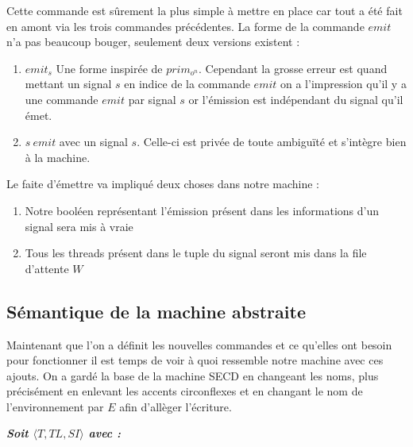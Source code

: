\documentclass[10pt,a4paper]{report}
\begin{document}
Cette commande est sûrement la plus simple à mettre en place car tout a été fait en amont via les trois commandes précédentes. La forme de la commande $emit$ n'a pas beaucoup bouger, seulement deux versions existent :
\begin{enumerate}
\item $emit_{s}$ Une forme inspirée de $prim_{o^{n}}$. Cependant la grosse erreur est quand mettant un signal $s$ en indice de la commande $emit$ on a l'impression qu'il y a une commande $emit$ par signal $s$ or l'émission est indépendant du signal qu'il émet.
\item $s~emit$ avec un signal $s$. Celle-ci est privée de toute ambiguïté et s'intègre bien à la machine. 
\end{enumerate}
\medbreak

Le faite d'émettre va impliqué deux choses dans notre machine :
\begin{enumerate}					
\item Notre booléen représentant l'émission présent dans les informations d'un signal sera mis à vraie
\item Tous les threads présent dans le tuple du signal seront mis dans la file d'attente $W$ 
\end{enumerate} 
\bigbreak
\bigbreak




\subsection{Sémantique de la machine abstraite}

Maintenant que l'on a définit les nouvelles commandes et ce qu'elles ont besoin pour fonctionner il est temps de voir à quoi ressemble notre machine avec ces ajouts. On a gardé la base de la machine SECD en changeant les noms, plus précisément en enlevant les accents circonflexes et en changant le nom de l'environnement par $E$ afin d'allèger l'écriture.
\bigbreak


\textbf{\textit{Soit $\langle T,TL,SI\rangle$ avec :}}
\end{document}
